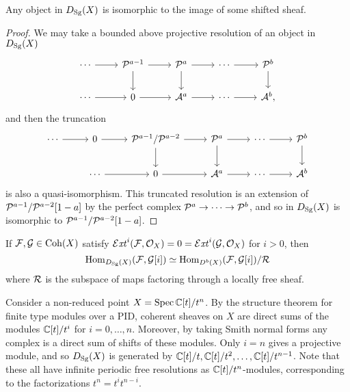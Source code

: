 
\begin{proposition}{}{}
    Any object in $D_{\mathrm{Sg}}(X)$ is isomorphic to the image of some shifted sheaf.
\end{proposition}

\begin{proof}
    We may take a bounded above projective resolution of an object in $D_{\mathrm{Sg}}(X)$
    \begin{equation*}
        \begin{tikzcd}
            \cdots \ar[r] & \calP^{a-1} \ar[r] \ar[d] &
            \calP^a \ar[r] \ar[d] & \cdots \ar[r] & \calP^b \ar[d] \\
            \cdots \ar[r] & 0 \ar[r] & \calA^a \ar[r] & \cdots \ar[r] & \calA^b,
        \end{tikzcd}
    \end{equation*}
    and then the truncation
    \begin{equation*}
        \begin{tikzcd}
            \cdots \ar[r] & 0 \ar[r] & \calP^{a-1}/\calP^{a-2} \ar[d] \ar[r] &
            \calP^a \ar[r] \ar[d] & \cdots \ar[r] & \calP^b \ar[d] \\
                & \cdots \ar[r] & 0 \ar[r] &
                \calA^a \ar[r] & \cdots \ar[r] & \calA^b
        \end{tikzcd}
    \end{equation*}
    is also a quasi-isomorphism. This truncated resolution is an extension of
    $\mathcal{P}^{a-1}/\mathcal{P}^{a-2}[1-a]$ by the perfect complex
    $\mathcal{P}^a\to\cdots\to\mathcal{P}^b$, and so in $D_{\mathrm{Sg}}(X)$ is isomorphic to
    $\mathcal{P}^{a-1}/\mathcal{P}^{a-2}[1-a]$.
\end{proof}

\begin{proposition}[label=prop:DSgHom]{}{}
    If $\mathcal{F},\mathcal{G}\in\operatorname{Coh}(X)$ satisfy
    $\operatorname{\mathcal{E}\mathit{xt}}^i(\mathcal{F},\mathcal{O}_X)=0=\operatorname{\mathcal{E}\mathit{xt}}^i(\mathcal{G},\mathcal{O}_X)$ for $i>0$, then
    \begin{equation*}
        \operatorname{Hom}_{D_{\mathrm{Sg}}(X)}(\mathcal{F},\mathcal{G}[i])
            \simeq \operatorname{Hom}_{D^b(X)}(\mathcal{F},\mathcal{G}[i])/\mathcal{R}
    \end{equation*}
    where $\mathcal{R}$ is the subspace of maps factoring through a locally free
    sheaf.
\end{proposition}


\begin{example}{}{}
    Consider a non-reduced point $X=\operatorname{Spec}\mathbb{C}[t]/t^n$. By the structure theorem
    for finite type modules over a PID, coherent sheaves on $X$ are direct sums
    of the modules $\mathbb{C}[t]/t^i$ for $i=0,\ldots,n$. Moreover, by taking Smith
    normal forms any complex is a direct sum of shifts of these modules. Only
    $i=n$ gives a projective module, and so $D_{\mathrm{Sg}}(X)$ is generated by
    $\mathbb{C}[t]/t,\mathbb{C}[t]/t^2,\ldots,\mathbb{C}[t]/t^{n-1}$. Note that these all have infinite
    periodic free resolutions as $\mathbb{C}[t]/t^n$-modules, corresponding to the
    factorizations $t^n=t^it^{n-i}$. %
\end{example}

